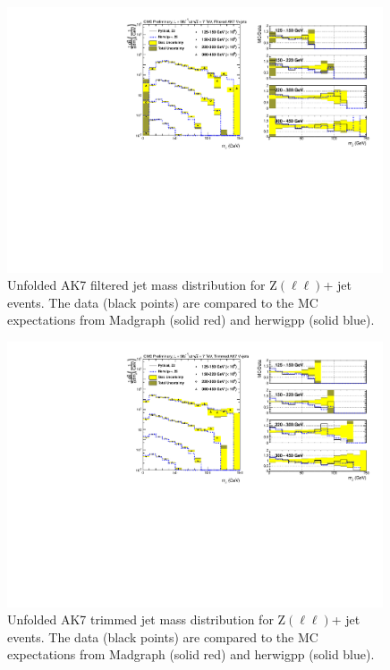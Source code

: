 \begin{figure}[!htb]
\includegraphics[width=0.99\textwidth]{figs/Zll/jetmassunf_ak7ft_log.pdf}
\caption{Unfolded AK7 filtered jet mass distribution for Z$(\ell\ell)$+ jet events. The data (black points) are compared to the MC expectations from Madgraph (solid red) and herwigpp (solid blue).}
\label{figs:AK7ZmmInt3}
\end{figure}

\begin{figure}[!htb]
\includegraphics[width=0.99\textwidth]{figs/Zll/jetmassunf_ak7tr_log.pdf}
\caption{Unfolded AK7 trimmed jet mass distribution for Z$(\ell\ell)$+ jet events. The data (black points) are compared to the MC expectations from Madgraph (solid red) and herwigpp (solid blue).}
\label{figs:AK7ZmmInt4}
\end{figure}


